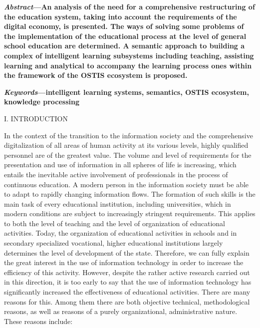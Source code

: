 \documentclass[twocolumn]{article}
\begin{document}
\begin{multicols}{2}
 \textbf{\textit{Abstract}—An analysis of the need for a comprehensive
restructuring of the education system, taking into account
the requirements of the digital economy, is presented. The
ways of solving some problems of the implementation
of the educational process at the level of general school
education are determined. A semantic approach to building
a complex of intelligent learning subsystems including
teaching, assisting learning and analytical to accompany the
learning process ones within the framework of the OSTIS
ecosystem is proposed.}
 \par 
  \textbf{\textit{Keywords}—intelligent learning systems, semantics, OSTIS ecosystem, knowledge processing}
  \normalsize
  \\
\begin{center}
I. INTRODUCTION
\end{center}
\par In the context of the transition to the information
society and the comprehensive digitalization of all areas
of human activity at its various levels, highly qualified
personnel are of the greatest value. The volume and
level of requirements for the presentation and use of
information in all spheres of life is increasing, which
entails the inevitable active involvement of professionals
in the process of continuous education. A modern person
in the information society must be able to adapt to rapidly
changing information flows. The formation of such skills
is the main task of every educational institution, including universities, which in modern conditions are subject
to increasingly stringent requirements. This applies to
both the level of teaching and the level of organization of educational activities. Today, the organization
of educational activities in schools and in secondary
specialized vocational, higher educational institutions
largely determines the level of development of the state.
Therefore, we can fully explain the great interest in the
use of information technology in order to increase the
efficiency of this activity. However, despite the rather
active research carried out in this direction, it is too
early to say that the use of information technology has
significantly increased the effectiveness of educational
activities. There are many reasons for this. Among
them there are both objective technical, methodological
reasons, as well as reasons of a purely organizational,
administrative nature. These reasons include:
\begin{itemize}

\end{itemize}
\end{multicols}
\end{document}
